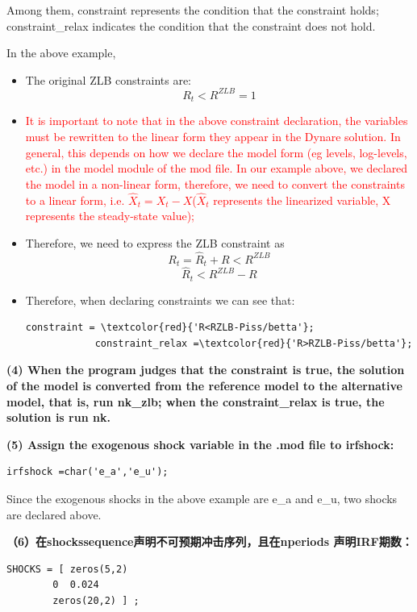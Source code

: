 \documentclass[10pt,math=newtx,citestyle=gb7714-2015,bibstyle=gb7714-2015]{elegantbook}
\begin{document}
{\begin{itemize}
	Among them, constraint represents the condition that the constraint holds; constraint\_relax indicates the condition that the constraint does not hold.
	
	In the above example,
	\begin{itemize}
		\item The original ZLB constraints are:
		$$R_t<R^{ZLB}=1$$
		\item \textcolor{red}{It is important to note that in the above constraint declaration, the variables must be rewritten to the linear form they appear in the Dynare solution. In general, this depends on how we declare the model form (eg levels, log-levels, etc.) in the model module of the mod file. In our example above, we declared the model in a non-linear form, therefore, we need to convert the constraints to a linear form, i.e. $\hat{X}_t=X_t-X$($\hat{X}_t $ represents the linearized variable, X represents the steady-state value);}
		\item Therefore, we need to express the ZLB constraint as
		$$R_t=\hat{R}_t+R<R^{ZLB}$$
		$$\hat{R}_t<R^{ZLB}-R$$
		\item Therefore, when declaring constraints we can see that:
		
		\begin{lstlisting}[frame=shadowbox]
			constraint = \textcolor{red}{'R<RZLB-Piss/betta'};
			constraint_relax =\textcolor{red}{'R>RZLB-Piss/betta'};
		\end{lstlisting}
	\end{itemize}
	
	\textbf{(4) When the program judges that the constraint is true, the solution of the model is converted from the reference model to the alternative model, that is, run nk\_zlb; when the constraint\_relax is true, the solution is run nk.}
	
	\textbf{(5) Assign the exogenous shock variable in the .mod file to irfshock:}
	
	\begin{lstlisting}[frame=shadowbox]
		irfshock =char('e_a','e_u');
	\end{lstlisting}
	
	Since the exogenous shocks in the above example are e\_a and e\_u, two shocks are declared above.
	
	\textbf{（6）在shockssequence声明不可预期冲击序列，且在nperiods 声明IRF期数：}
	
	\begin{lstlisting}[frame=shadowbox]
		SHOCKS = [ zeros(5,2)
		0  0.024
		zeros(20,2) ] ;
		

\end{lstlisting}
\end{itemize}}
\end{document}

